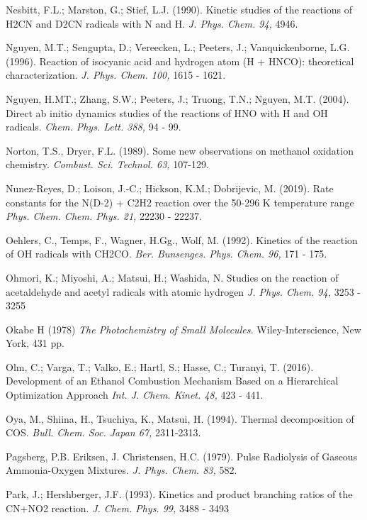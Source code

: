 \documentclass[12pt,landscape]{article}
\newcounter{reaction}
\begin{document}
Nesbitt, F.L.; Marston, G.; Stief, L.J. (1990). Kinetic studies of the reactions of H2CN and D2CN radicals with N and H.  {\em J. Phys. Chem. 94,} 4946.

Nguyen, M.T.; Sengupta, D.; Vereecken, L.; Peeters, J.; Vanquickenborne, L.G. (1996).
 Reaction of isocyanic acid and hydrogen atom (H + HNCO): theoretical characterization.  
 {\em J. Phys. Chem. 100,} 1615 - 1621.

Nguyen, H.MT.; Zhang, S.W.; Peeters, J.; Truong, T.N.; Nguyen, M.T. (2004).  Direct ab initio dynamics studies of the reactions of HNO with H and OH radicals. 
{\em Chem. Phys. Lett.   388,} 94 - 99.

Norton, T.S., Dryer, F.L. (1989). Some new observations on methanol oxidation chemistry.  {\em Combust. Sci. Technol.  63,} 107-129.

Nunez-Reyes, D.; Loison, J.-C.; Hickson, K.M.; Dobrijevic, M. (2019).
Rate constants for the N(D-2) + C2H2 reaction over the 50-296 K temperature range
{\em Phys. Chem. Chem. Phys. 21,} 22230 - 22237.

Oehlers, C., Temps, F., Wagner, H.Gg., Wolf, M. (1992). Kinetics of the reaction of OH radicals with CH2CO. {\em Ber. Bunsenges. Phys. Chem. 96,} 171 - 175.

Ohmori, K.; Miyoshi, A.; Matsui, H.; Washida, N.
Studies on the reaction of acetaldehyde and acetyl radicals with atomic hydrogen
{\em J. Phys. Chem. 94,} 3253 - 3255

Okabe H (1978) {\em The Photochemistry of Small Molecules.} Wiley-Interscience, New York, 431 pp.

Olm, C.; Varga, T.; Valko, E.; Hartl, S.; Hasse, C.; Turanyi, T. (2016).
Development of an Ethanol Combustion Mechanism Based on a Hierarchical Optimization Approach
{\em Int. J. Chem. Kinet. 48,} 423 - 441.


Oya, M., Shiina, H., Tsuchiya, K., Matsui, H. (1994). Thermal decomposition of COS. {\em Bull. Chem. Soc. Japan 67,} 2311-2313.

Pagsberg, P.B. Eriksen, J. Christensen, H.C. (1979).  Pulse Radiolysis of Gaseous Ammonia-Oxygen Mixtures.  {\em J. Phys. Chem. 83,} 582.

Park, J.; Hershberger, J.F. (1993).  Kinetics and product branching ratios of the CN+NO2 reaction.
{\em J. Chem. Phys.  99,}  3488 - 3493
\end{document}
